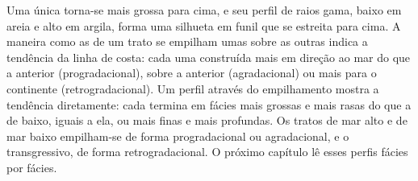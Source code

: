 Uma única  torna-se mais grossa para cima, e seu perfil de raios gama, baixo em areia
e alto em argila, forma uma silhueta em funil que se estreita para cima. A maneira como as
 de um trato se empilham umas sobre as outras indica a tendência da
linha de costa: cada uma construída mais em direção ao mar do que a anterior (progradacional),
sobre a anterior (agradacional) ou mais para o continente (retrogradacional). Um perfil através do empilhamento
mostra a tendência diretamente: cada  termina em fácies mais grossas e mais rasas
do que a de baixo, iguais a ela, ou mais finas e mais profundas.
Os tratos de mar alto e de mar baixo empilham-se de forma progradacional ou agradacional,
e o transgressivo, de forma retrogradacional. O próximo capítulo lê esses perfis fácies
por fácies.

